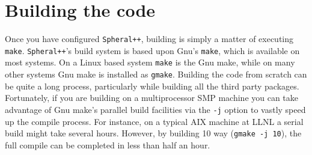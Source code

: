 \documentclass{article}
\newcommand{\Spheral}{{\tt Spheral++}}
\begin{document}
\section{Building the code}

Once you have configured \Spheral, building is simply a matter of executing {\tt
make}.  \Spheral's build system is based upon Gnu's \verb+make+, which is
available on most systems.  On a Linux based system \verb+make+ is the Gnu make,
while on many other systems Gnu make is installed as \verb+gmake+.  Building the
code from scratch can be quite a long process, particularly while building all
the third party packages.  Fortunately, if you are building on a multiprocessor
SMP machine you can take advantage of Gnu make's parallel build facilities via
the \verb+-j+ option to vastly speed up the compile process.  For instance, on a
typical AIX machine at LLNL a serial build might take several hours.  However,
by building 10 way (\verb+gmake -j 10+), the full compile can be completed in
less than half an hour.

\end{document}
